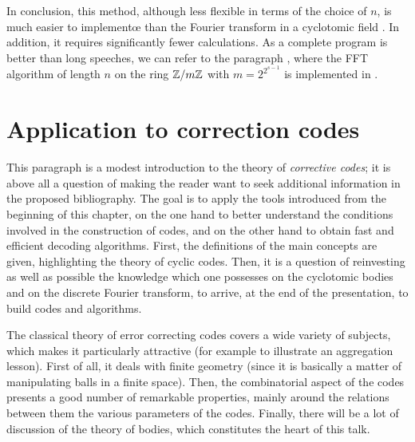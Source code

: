  
 
 In conclusion, this method, although less flexible in terms of the choice of $ n $, is much easier to implement{\oe} than the Fourier transform in a cyclotomic field . In addition, it requires significantly fewer calculations. As a complete program is better than long speeches, we can refer to the paragraph , where the FFT algorithm of length $ n $ on the ring $ \mathbb{Z}/m \mathbb{Z} $ with $ m = 2^{2^{s-1}} $ is implemented in \Maple{}.

\section{Application to correction codes}
\label{sect1-applications-correctors-codes}
 
 
 
 This paragraph is a modest introduction to the theory of \textit{corrective codes}; it is above all a question of making the reader want to seek additional information in the proposed bibliography. The goal is to apply the tools introduced from the beginning of this chapter, on the one hand to better understand the conditions involved in the construction of codes, and on the other hand to obtain fast and efficient decoding algorithms. First, the definitions of the main concepts are given, highlighting the theory of cyclic codes. Then, it is a question of reinvesting as well as possible the knowledge which one possesses on the cyclotomic bodies and on the discrete Fourier transform, to arrive, at the end of the presentation, to build codes and algorithms.
 
 
The classical theory of error correcting codes covers a wide variety of subjects, which makes it particularly attractive (for example to illustrate an aggregation lesson). First of all, it deals with finite geometry (since it is basically a matter of manipulating balls in a finite space). Then, the combinatorial aspect of the codes presents a good number of remarkable properties, mainly around the relations between them the various parameters of the codes. Finally, there will be a lot of discussion of the theory of bodies, which constitutes the heart of this talk.
 
